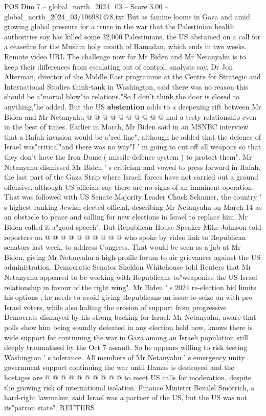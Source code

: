 \begin{textsample}{POS Dim 7 – global\_north\_2024\_03 – Score 3.00 – global\_north\_2024\_03/106981478.txt}
But as famine looms in Gaza and amid growing global pressure for a truce in the war that the Palestinian health authorities say has killed some 32,000 Palestinians, the US abstained on a call for a ceasefire for the Muslim holy month of Ramadan, which ends in two weeks.
Remote video URL The challenge now for Mr Biden and Mr Netanyahu is to keep their differences from escalating out of control, analysts say.
Dr Jon Alterman, director of the Middle East programme at the Centre for Strategic and International Studies think-tank in Washington, said there was no reason this should be a"mortal blow"to relations."So I don't think the door is closed to anything,"he added.
But the US \textbf{abstention} adds to a deepening rift between Mr Biden and Mr Netanyahu @ @ @ @ @ @ @ @ @ @ had a testy relationship even in the best of times.
Earlier in March, Mr Biden said in an MSNBC interview that a Rafah invasion would be a"red line", although he added that the defence of Israel was"critical"and there was no way"I ' m going to cut off all weapons so that they don't have the Iron Dome ( missile defence system ) to protect them".
Mr Netanyahu dismissed Mr Biden ' s criticism and vowed to press forward in Rafah, the last part of the Gaza Strip where Israeli forces have not carried out a ground offensive, although US officials say there are no signs of an imminent operation.
That was followed with US Senate Majority Leader Chuck Schumer, the country ' s highest-ranking Jewish elected official, describing Mr Netanyahu on March 14 as an obstacle to peace and calling for new elections in Israel to replace him.
Mr Biden called it a"good speech".
But Republican House Speaker Mike Johnson told reporters on @ @ @ @ @ @ @ @ @ @ who spoke by video link to Republican senators last week, to address Congress.
That would be seen as a jab at Mr Biden, giving Mr Netanyahu a high-profile forum to air grievances against the US administration.
Democratic Senator Sheldon Whitehouse told Reuters that Mr Netanyahu appeared to be working with Republicans to"weaponise the US-Israel relationship in favour of the right wing".
Mr Biden ' s 2024 re-election bid limits his options ; he needs to avoid giving Republicans an issue to seize on with pro-Israel voters, while also halting the erosion of support from progressive Democrats dismayed by his strong backing for Israel.
Mr Netanyahu, aware that polls show him being soundly defeated in any election held now, knows there is wide support for continuing the war in Gaza among an Israeli population still deeply traumatised by the Oct 7 assault.
So he appears willing to risk testing Washington ' s tolerance.
All members of Mr Netanyahu ' s emergency unity government support continuing the war until Hamas is destroyed and the hostages are @ @ @ @ @ @ @ @ @ @ to meet US calls for moderation, despite the growing risk of international isolation.
Finance Minister Bezalel Smotrich, a hard-right lawmaker, said Israel was a partner of the US, but the US was not its"patron state".
REUTERS

\end{textsample}
